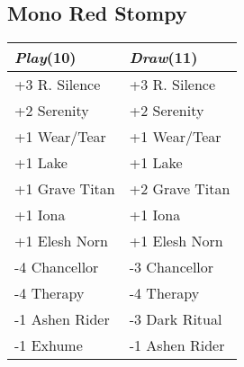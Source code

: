 \documentclass{article}
\renewcommand *\contentsname{Contents}
\begin{document}
\begin{multicols}{2}
\subsection*{Mono Red Stompy}
\begin{center}
\begin{tabular}{| l | l |}
\hline
\textit{Play}(10) & \textit{Draw}(11) \\
\hline
\cellcolor[HTML]{BBDDBB}\small{+3 R. Silence} & \cellcolor[HTML]{BBDDBB}\small{+3 R. Silence}\\
\cellcolor[HTML]{BBDDBB}\small{+2 Serenity} & \cellcolor[HTML]{BBDDBB}\small{+2 Serenity}\\
\cellcolor[HTML]{BBDDBB}\small{+1 Wear/Tear} & \cellcolor[HTML]{BBDDBB}\small{+1 Wear/Tear}\\
\cellcolor[HTML]{BBDDBB}\small{+1 Lake} & \cellcolor[HTML]{BBDDBB}\small{+1 Lake}\\
\cellcolor[HTML]{BBDDBB}\small{+1 Grave Titan} & \cellcolor[HTML]{BBDDBB}\small{+2 Grave Titan}\\
\cellcolor[HTML]{BBDDBB}\small{+1 Iona} & \cellcolor[HTML]{BBDDBB}\small{+1 Iona}\\
\cellcolor[HTML]{BBDDBB}\small{+1 Elesh Norn} & \cellcolor[HTML]{BBDDBB}\small{+1 Elesh Norn}\\
\cellcolor[HTML]{DDBBBB}\small{-4 Chancellor} & \cellcolor[HTML]{DDBBBB}\small{-3 Chancellor}\\
\cellcolor[HTML]{DDBBBB}\small{-4 Therapy} & \cellcolor[HTML]{DDBBBB}\small{-4 Therapy}\\
\cellcolor[HTML]{DDBBBB}\small{-1 Ashen Rider} & \cellcolor[HTML]{DDBBBB}\small{-3 Dark Ritual}\\
\cellcolor[HTML]{DDBBBB}\small{-1 Exhume} & \cellcolor[HTML]{DDBBBB}\small{-1 Ashen Rider}\\
\hline
\end{tabular}
\end{center}

\end{multicols}
\end{document}
